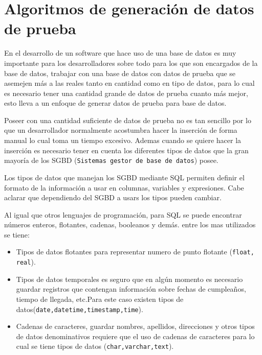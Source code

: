\chapter{Algoritmos de generaci\'on de datos de prueba}
En el desarrollo de un software que hace uso de una base de datos es muy importante para los desarrolladores sobre todo para los que son encargados de la base de datos, trabajar con una base de datos con datos de prueba  que se asemejen m\'as a las reales tanto en cantidad como en tipo de datos, para lo cual es necesario tener una cantidad grande de datos de prueba cuanto m\'as mejor, esto lleva a un enfoque de generar datos de prueba para base de datos.


Poseer con una cantidad suficiente de datos de prueba no es tan sencillo por lo que un desarrollador normalmente acostumbra hacer la inserci\'on de forma manual lo cual toma un  tiempo excesivo. Ademas cuando se quiere hacer la inserci\'on es necesario tener en cuenta los diferentes tipos de datos que la gran mayor\'ia de los SGBD (\texttt{Sistemas gestor de base de datos}) posee.
 
Los tipos de datos que manejan los SGBD mediante SQL permiten definir el formato de la informaci\'on a usar en  columnas, variables y expresiones. Cabe aclarar que dependiendo del SGBD a usars los tipos pueden cambiar.

Al igual que otros lenguajes de programaci\'on, para SQL se puede encontrar n\'umeros enteros, flotantes, cadenas, booleanos y dem\'as. entre los mas utilizados se tiene:

\begin{itemize}
\item Tipos de datos flotantes para representar numero de punto flotante (\texttt{float, real}).
\item Tipos de datos temporales es seguro que en alg\'un momento es necesario guardar registros que contengan informaci\'on sobre fechas de cumplea\~nos, tiempo de llegada, etc.Para este caso existen tipos de datos(\texttt{date,datetime,timestamp,time}).
\item Cadenas de caracteres, guardar nombres, apellidos, direcciones y otros tipos de datos denominativos requiere que el uso de cadenas de caracteres para lo cual se tiene tipos de datos (\texttt{char,varchar,text}).
\end{itemize}

